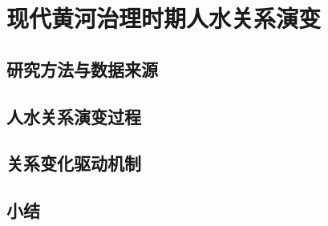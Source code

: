 \chapter{现代黄河治理时期人水关系演变}\label{cha:4}


\section{研究方法与数据来源}\label{ch4:methods}


\section{人水关系演变过程}\label{ch4:process}


\section{关系变化驱动机制}\label{ch4:mechanism}




\section{小结}\label{ch4:summary}

